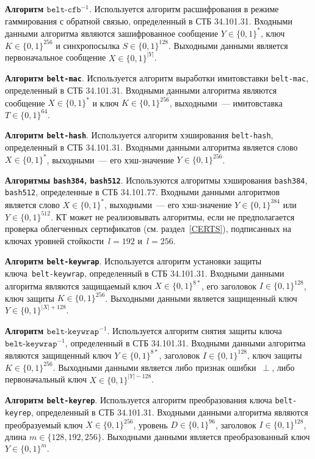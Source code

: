 {\bf Алгоритм $\texttt{belt-cfb}^{-1}$}.
Используется алгоритм расшифрования в режиме 
гаммирования с обратной связью, определенный в СТБ 34.101.31. 
Входными данными алгоритма являются зашифрованное 
сообщение $Y\in\{0,1\}^*$, ключ $K\in\{0,1\}^{256}$ 
и синхропосылка $S\in\{0,1\}^{128}$. Выходными 
данными является первоначальное сообщение $X\in\{0,1\}^{|Y|}$.

{\bf Алгоритм \texttt{belt-mac}}.
Используется алгоритм выработки имитовставки \texttt{belt-mac}, 
определенный в СТБ 34.101.31. Входными данными алгоритма 
являются сообщение $X\in\{0,1\}^*$ и ключ $K\in\{0,1\}^{256}$, 
выходными~--- имитовставка $T\in\{0,1\}^{64}$.

{\bf Алгоритм \texttt{belt-hash}}.
Используется алгоритм хэширования \texttt{belt-hash},
определенный в СТБ 34.101.31. Входными данными алгоритма 
является слово $X\in\{0,1\}^*$, выходными~--- 
его хэш-значение $Y\in\{0,1\}^{256}$.

{\bf Алгоритмы \texttt{bash384}, \texttt{bash512}}.
Используются алгоритмы хэширования \texttt{bash384}, \texttt{bash512},
определенные в СТБ 34.101.77. Входными данными алгоритмов
является слово $X\in\{0,1\}^*$, выходными~--- 
его хэш-значение $Y\in\{0,1\}^{384}$ или $Y\in\{0,1\}^{512}$.
%
КТ может не реализовывать алгоритмы, если не предполагается проверка 
облегченных сертификатов (см. раздел~\ref{CERTS}), подписанных на ключах 
уровней стойкости~$l=192$ и~$l=256$.

{\bf Алгоритм \texttt{belt-keywrap}}.
Используется алгоритм установки защиты ключа~\texttt{belt-keywrap}, 
определенный в СТБ 34.101.31. Входными данными алгоритма являются 
защищаемый ключ $X\in\{0,1\}^{8*}$, его заголовок $I\in\{0,1\}^{128}$, ключ 
защиты $K\in\{0,1\}^{256}$. 
Выходными данными является защищенный ключ $Y\in\{0,1\}^{|X|+128}$.

{\bf Алгоритм $\texttt{belt-keywrap}^{-1}$}.
Используется алгоритм снятия защиты ключа~$\texttt{belt-keywrap}^{-1}$, 
определенный в СТБ 34.101.31. Входными данными алгоритма являются 
защищенный ключ $Y\in\{0,1\}^{8*}$, заголовок $I\in\{0,1\}^{128}$, 
ключ защиты $K\in\{0,1\}^{256}$. Выходными данными является либо признак 
ошибки~$\perp$, либо первоначальный ключ $X\in\{0,1\}^{|Y|-128}$.

{\bf Алгоритм \texttt{belt-keyrep}}.
Используется алгоритм преобразования ключа 
\texttt{belt-keyrep}, определенный в СТБ 34.101.31.
Входными данными алгоритма являются преобразуемый ключ $X\in\{0,1\}^{256}$, 
уровень $D\in\{0,1\}^{96}$, заголовок $I\in\{0,1\}^{128}$, 
длина $m\in\{128,192,256\}$. Выходными данными 
является преобразованный ключ $Y\in\{0,1\}^{m}$.

